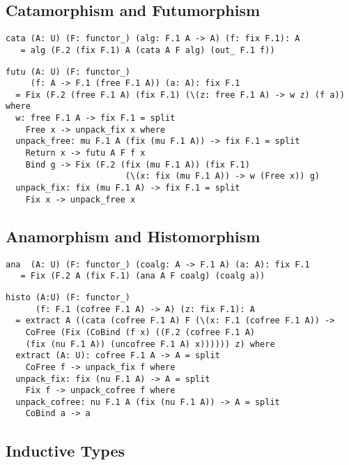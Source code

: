\documentclass{article}
\begin{document}
\subsection{Catamorphism and Futumorphism}

\begin{lstlisting}[mathescape=true]
cata (A: U) (F: functor_) (alg: F.1 A -> A) (f: fix F.1): A
   = alg (F.2 (fix F.1) A (cata A F alg) (out_ F.1 f))
\end{lstlisting}

\begin{lstlisting}[mathescape=true]
futu (A: U) (F: functor_)
     (f: A -> F.1 (free F.1 A)) (a: A): fix F.1
  = Fix (F.2 (free F.1 A) (fix F.1) (\(z: free F.1 A) -> w z) (f a)) where
  w: free F.1 A -> fix F.1 = split
    Free x -> unpack_fix x where
  unpack_free: mu F.1 A (fix (mu F.1 A)) -> fix F.1 = split
    Return x -> futu A F f x
    Bind g -> Fix (F.2 (fix (mu F.1 A)) (fix F.1)
                        (\(x: fix (mu F.1 A)) -> w (Free x)) g)
  unpack_fix: fix (mu F.1 A) -> fix F.1 = split
    Fix x -> unpack_free x
\end{lstlisting}

\subsection{Anamorphism and Histomorphism}

\begin{lstlisting}[mathescape=true]
ana  (A: U) (F: functor_) (coalg: A -> F.1 A) (a: A): fix F.1
   = Fix (F.2 A (fix F.1) (ana A F coalg) (coalg a))
\end{lstlisting}

\begin{lstlisting}[mathescape=true]
histo (A:U) (F: functor_)
      (f: F.1 (cofree F.1 A) -> A) (z: fix F.1): A
  = extract A ((cata (cofree F.1 A) F (\(x: F.1 (cofree F.1 A)) ->
    CoFree (Fix (CoBind (f x) ((F.2 (cofree F.1 A)
    (fix (nu F.1 A)) (uncofree F.1 A) x)))))) z) where
  extract (A: U): cofree F.1 A -> A = split
    CoFree f -> unpack_fix f where
  unpack_fix: fix (nu F.1 A) -> A = split
    Fix f -> unpack_cofree f where
  unpack_cofree: nu F.1 A (fix (nu F.1 A)) -> A = split
    CoBind a -> a
\end{lstlisting}

\subsection{Inductive Types}
\end{document}
